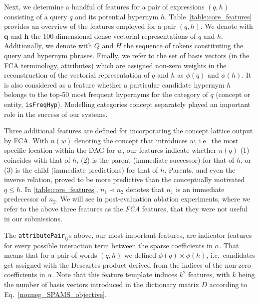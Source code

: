 \documentclass[11pt,a4paper]{article}
\begin{document}
Next, we determine a handful of features for a pair of expressions $(q, h)$
consisting of a query $q$ and its potential hypernym $h$.
Table~\ref{table:core_features} provides an overview of the features
employed for a pair $(q, h)$.
We denote with $\mathbf{q}$ and $\mathbf{h}$ the 100-dimensional dense
vectorial representations of $q$ and $h$.
Additionally, we denote with $Q$ and $H$ the sequence of tokens constituting
the query and hypernym phrases.
Finally, we refer to the set of basis vectors (in the FCA terminology,
attributes) which are assigned non-zero weights in the reconstruction of the
vectorial representation of $q$ and $h$ as $\phi(q)$ and $\phi(h)$.  
It is also considered as a feature whether a
particular candidate hypernym $h$ belongs to the top-50 most frequent hypernyms
for the category of $q$ (concept or entity, \texttt{isFreqHyp}).
Modelling categories concept separately played an important role in the success
of our systems.

Three additional features are defined for incorporating the concept lattice
output by FCA. With $n(w)$ denoting the concept that introduces $w$, i.e.~the
most specific location within the DAG for $w$, our features indicate whether
$n(q)$ 
(1) coincides with that of $h$,
(2) is the parent (immediate successor) for that of $h$, or
(3) is the child (immediate predictions) for that of $h$.
Parents, and even the inverse relation, proved to be more predictive
than the conceptually motivated  $q\le h$.
In \autoref{table:core_features}, $n_1\prec n_2$ denotes that $n_1$ is an
immediate predecessor of $n_2$.
We will see in post-evaluation ablation experiments, where we refer to the
above three features as the \emph{FCA} features, that they were not useful in
our submissions.



The \texttt{attributePair}$_{ij}$s above, our most important features, are 
indicator features for every possible interaction term 
between the sparse coefficients in $\alpha$. That means that for a pair of
words $(q, h)$ we defined $\phi(q) \times \phi(h)$, i.e.~candidates
get assigned with the Descartes product derived from the indices of the non-zero
coefficients in $\alpha$. Note that this feature template induces $k^2$
features, with $k$ being the number of basis vectors introduced in the dictionary matrix $D$ according to Eq.~\ref{nonneg_SPAMS_objective}.
\end{document}
